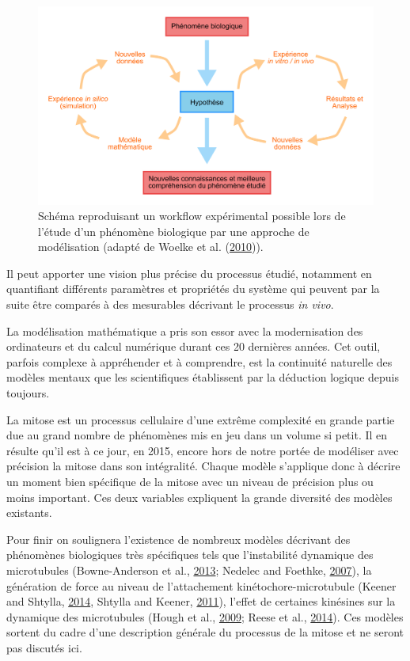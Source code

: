 \documentclass[12pt,a4paper,twoside,openright]{book}
\begin{document}
\begin{figure}[htbp]
\centering
\includegraphics{figures/intro/modelling.png}
\caption[Workflow de l'approche modélisation en biologie]{\label{fig:modelling}Schéma
reproduisant un workflow expérimental possible lors de l'étude d'un
phénomène biologique par une approche de modélisation (adapté de Woelke
et al. (\hyperref[ref-Woelke2010]{2010})).}
\end{figure}

Il peut apporter une vision plus précise du processus étudié, notamment
en quantifiant différents paramètres et propriétés du système qui
peuvent par la suite être comparés à des mesurables décrivant le
processus \emph{in vivo}.

La modélisation mathématique a pris son essor avec la modernisation des
ordinateurs et du calcul numérique durant ces 20 dernières années. Cet
outil, parfois complexe à appréhender et à comprendre, est la continuité
naturelle des modèles mentaux que les scientifiques établissent par la
déduction logique depuis toujours.

La mitose est un processus cellulaire d'une extrême complexité en grande
partie due au grand nombre de phénomènes mis en jeu dans un volume si
petit. Il en résulte qu'il est à ce jour, en 2015, encore hors de notre
portée de modéliser avec précision la mitose dans son intégralité.
Chaque modèle s'applique donc à décrire un moment bien spécifique de la
mitose avec un niveau de précision plus ou moins important. Ces deux
variables expliquent la grande diversité des modèles existants.

Pour finir on soulignera l'existence de nombreux modèles décrivant des
phénomènes biologiques très spécifiques tels que l'instabilité dynamique
des microtubules (Bowne-Anderson et al.,
\hyperref[ref-Bowne-Anderson2013]{2013}; Nedelec and Foethke,
\hyperref[ref-Nedelec2007]{2007}), la génération de force au niveau de
l'attachement kinétochore-microtubule (Keener and Shtylla,
\hyperref[ref-Keener2014]{2014}, Shtylla and Keener,
\hyperref[ref-Shtylla2011]{2011}), l'effet de certaines kinésines sur la
dynamique des microtubules (Hough et al.,
\hyperref[ref-Hough2009]{2009}; Reese et al.,
\hyperref[ref-Reese2014]{2014}). Ces modèles sortent du cadre d'une
description générale du processus de la mitose et ne seront pas discutés
ici.
\end{document}
